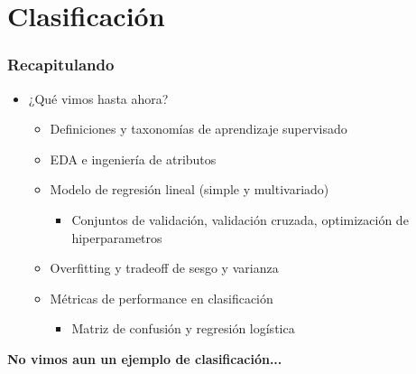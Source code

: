 \documentclass[leqno, 10pt, envcountsect]{beamer}
\numberwithin{equation}{section}
\theoremstyle{definition}
\theoremstyle{example}
\numberwithin{figure}{section}
\numberwithin{table}{section}
\let\olditem\item
\renewcommand{\item}{%
\olditem\vspace{1pt}}
\begin{document}
\section{Clasificación}
\label{sec:clasificacion}

\begin{frame}
  \frametitle{Recapitulando}
  \begin{itemize}
    \item ¿Qué vimos hasta ahora?
      \begin{itemize}
        \item Definiciones y taxonomías de aprendizaje supervisado
        \item EDA e ingeniería de atributos
        \item Modelo de regresión lineal (simple y multivariado)
          \begin{itemize}
            \item Conjuntos de validación, validación cruzada, optimización de
              hiperparametros
          \end{itemize}
        \item Overfitting y tradeoff de sesgo y varianza
        \item Métricas de performance en clasificación
          \begin{itemize}
            \item Matriz de confusión y regresión logística
          \end{itemize}
      \end{itemize}
  \end{itemize}
  \textbf{No vimos aun un ejemplo de clasificación...}
\end{frame}
\end{document}
